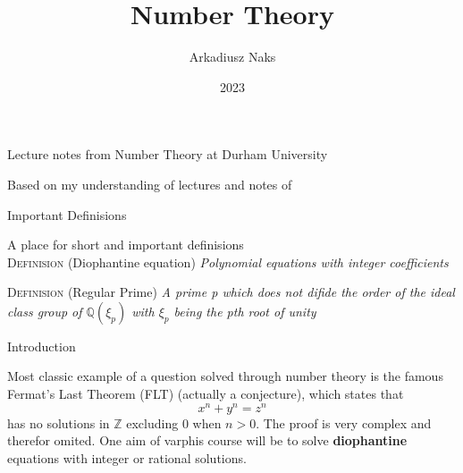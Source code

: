\documentclass[12pt, letterpaper]{article}
\title{Number Theory}
\author{Arkadiusz Naks}
\date{2023}
\newcommand{\Q}{\mathbb{Q}}
\newcommand{\Z}{\mathbb{Z}}
\begin{document}
\begin{titlepage}
  \begin{center}
    \makeatletter
    \vspace*{1cm}
    \Huge
    \textbf{\@title}

    \vspace{0.5cm}
    \Large
    Lecture notes from Number Theory at Durham University

    \vspace{1.5cm}

    \textbf{\@author}

    \vfill

    \vspace{0.8cm}

    \small
    Based on my understanding of lectures and notes of \\
    \@date{}
  \end{center}
\end{titlepage}

\tableofcontents
\newpage

\begin{section}{Important Definisions}

  A place for short and important definisions \\

  \textsc{Definision} (Diophantine equation) \textit{Polynomial equations with
    integer coefficients}

  \textsc{Definision} (Regular Prime) \textit{A prime p which does not difide
    the order of the ideal class group of \(\Q(\xi_{p})\) with \(\xi_{p}\)
    being the pth root of unity}

\end{section}

\begin{section}{Introduction}

  Most classic example of a question solved through number theory is the famous
  Fermat's Last Theorem (FLT) (actually a conjecture), which states that
  \[x^{n} + y^{n} = z^{n}\] has no solutions in \(\Z\) excluding 0 when
  \(n > 0\). The proof is very complex and therefor omited. One aim of varphis
  course will be to solve \textbf{diophantine} equations with integer or
  rational solutions.

\end{section}
\end{document}
